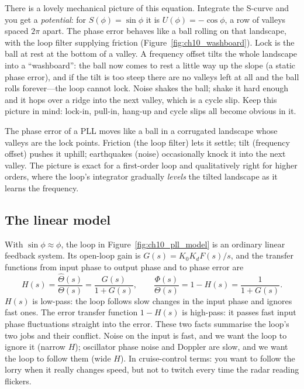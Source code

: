 There is a lovely mechanical picture of this equation. Integrate the S-curve and you get a
\emph{potential}: for $S(\phi)=\sin\phi$ it is $U(\phi)=-\cos\phi$, a row of valleys spaced $2\pi$
apart. The phase error behaves like a ball rolling on that landscape, with the loop filter
supplying friction (Figure~\ref{fig:ch10_washboard}). Lock is the ball at rest at the bottom of a
valley. A frequency offset tilts the whole landscape into a ``washboard'': the ball now comes to
rest a little way up the slope (a static phase error), and if the tilt is too steep there are no
valleys left at all and the ball rolls forever---the loop cannot lock. Noise shakes the ball;
shake it hard enough and it hops over a ridge into the next valley, which is a cycle slip. Keep
this picture in mind: lock-in, pull-in, hang-up and cycle slips all become obvious in it.


\begin{analogy}
The phase error of a PLL moves like a ball in a corrugated landscape whose valleys are the lock
points. Friction (the loop filter) lets it settle; tilt (frequency offset) pushes it uphill;
earthquakes (noise) occasionally knock it into the next valley. The picture is exact for a
first-order loop and qualitatively right for higher orders, where the loop's integrator
gradually \emph{levels} the tilted landscape as it learns the frequency.
\end{analogy}

\subsection{The linear model}

With $\sin\phi\approx\phi$, the loop in Figure~\ref{fig:ch10_pll_model} is an ordinary linear feedback
system. Its open-loop gain is $G(s)=K_0K_dF(s)/s$, and the transfer functions from input phase to
output phase and to phase error are
\begin{equation}
H(s)=\frac{\hat\Theta(s)}{\Theta(s)}=\frac{G(s)}{1+G(s)},\qquad
\frac{\Phi(s)}{\Theta(s)}=1-H(s)=\frac{1}{1+G(s)}.
\label{eq:ch10:H}
\end{equation}
$H(s)$ is low-pass: the loop follows slow changes in the input phase and ignores fast ones. The
error transfer function $1-H(s)$ is high-pass: it passes fast input phase fluctuations straight
into the error. These two facts summarise the loop's two jobs and their conflict. Noise on the input
is fast, and we want the loop to ignore it (narrow $H$); oscillator phase noise and Doppler are
slow, and we want the loop to follow them (wide $H$). In cruise-control terms: you want to follow
the lorry when it really changes speed, but not to twitch every time the radar reading flickers.

